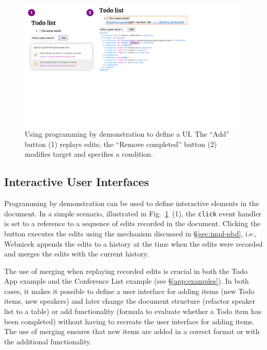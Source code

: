 \documentclass[sigconf,anonymous,screen]{acmart}
\begin{document}
\begin{figure}[t]
\vspace{-0.5em}
\includegraphics[width=1\columnwidth,clip,trim=0.5cm 8.5cm 8.5cm 0.5cm]{fig/interactive.pdf}
\vspace{-1.25em}
\caption{Using programming by demonstration to define a UI. The ``Add'' button (1) replays edits;
the ``Remove completed'' button (2) modifies target and specifies a condition. }
\label{fig:interactive}
\vspace{-1em}
\end{figure}


\subsection{Interactive User Interfaces}
\label{sec:impl-interaction}

Programming by demonstration can be used to define interactive elements in the document. In a
simple scenario, illustrated in Fig.~\ref{fig:interactive}~(1), the {\small\Verb_click_} event
handler is set to a reference to a sequence of edits recorded in the document. Clicking the button
executes the edits using the mechanism discussed in \S\ref{sec:impl-pbd}, i.e., Webnicek appends
the edits to a history at the time when the edits were recorded and merges the edits with the
current history.

The use of merging when replaying recorded edits is crucial in both the Todo App example and the
Conference List example (see \S\ref{app:examples}). In both cases, it makes it possible to define
a user interface for adding items (new Todo items, new speakers) and later change the document
structure (refactor speaker list to a table) or add functionality (formula to evaluate whether a
Todo item has been completed) without having to recreate the user interface for adding items.
The use of merging ensures that new items are added in a correct format or with the additional
functionality.
\end{document}
